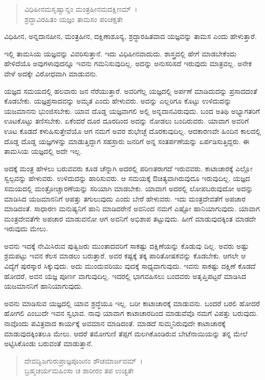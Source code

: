 \begin{verse}
ವಿಧಿಹೀನಮಸೃಷ್ವಾನ್ನಂ ಮಂತ್ರಹೀನಮದಕ್ಷಿಣಮ್~।\\ಶ್ರದ್ಧಾವಿರಹಿತಂ ಯಜ್ಞಂ ತಾಮಸಂ ಪರಿಚಕ್ಷತೇ 
\end{verse}

{\small ವಿಧಿಹೀನ, ಅನ್ನದಾನಹೀನ, ಮಂತ್ರಹೀನ, ದಕ್ಷಿಣಾಶೂನ್ಯ, ಶ್ರದ್ಧಾರಹಿತವಾದ ಯಜ್ಞವನ್ನು ತಾಮಸ ಎಂದು ಹೇಳುತ್ತಾರೆ.}

ಇಲ್ಲಿ ತಾಮಸಿಯ ಯಜ್ಞವನ್ನು ವಿವರಿಸುತ್ತಾನೆ. ಇದು ವಿಧಿಹೀನವಾದುದು. ಶಾಸ್ತ್ರದಲ್ಲಿ ಹೇಗೆ ಮಾಡಬೇಕೆಂದು ಹೇಳಿದೆಯೊ ಅವುಗಳಾವುದನ್ನೂ ಇವನು ಗಮನಿಸುವುದಿಲ್ಲ. ಅದನ್ನು ಅನುಸರಿಸದೆ ಇರುವುದು ಮಾತ್ರವಲ್ಲ. ಅನೇಕ ವೇಳೆ ಅದಕ್ಕೇ ವಿರೋಧವಾಗಿ ಮಾಡುವನು.

ಯಜ್ಞದ ಸಮಯದಲ್ಲಿ ಹಲವಾರು ಜನ ನೆರೆಯುತ್ತಾರೆ. ಅವರಿಗೆಲ್ಲ ಯಜ್ಞದಲ್ಲಿ ಅರ್ಪಣೆ ಮಾಡಿದುದನ್ನು ಪ್ರಸಾದದಂತೆ ಕೊಡಬೇಕು. ಯಜ್ಞಪ್ರಸಾದವನ್ನು ಅಮೃತ ಎಂದು ಹೇಳುವರು. ಅದನ್ನು ಎಲ್ಲರಿಗೂ ಕೊಟ್ಟು ಉಳಿದುದನ್ನು ಯಜಮಾನನು ಭುಂಜಿಸಬೇಕು. ಯಾವ ದೊಡ್ಡ ಯಜ್ಞವಾಗಲಿ ಅಲ್ಲಿ ಅನ್ನದಾನವಿರುವುದು. ಬಂದ ಅತಿಥಿ ಅಭ್ಯಾಗತರಿಗೆ ಊಟಕೊಟ್ಟು ತಣಿಸಬೇಕು. ಏಕೆಂದರೆ ದೂರ ದೂರದಿಂದ ಅದನ್ನು ನೋಡಲು ಬಂದಿರುವರು. ಯಾವಾಗ ಅವರಿಗೆ ಊಟ ಕೊಡದೆ ಕಳುಹಿಸುತ್ತೇವೆಯೊ ಆಗ ನಮಗೆ ಅವರ ಶುಭೇಚ್ಛೆ ದೊರಕುವುದಿಲ್ಲ. ಆದಕಾರಣವೇ ಹಿಂದಿನ ಕಾಲದಲ್ಲಿ ದೊಡ್ಡ ದೊಡ್ಡ ಯಜ್ಞಗಳನ್ನು ಮಾಡುತ್ತಿದ್ದಾಗ ಸಹಸ್ರಾರು ಜನರಿಗೆ ಅನ್ನ ಸಂತರ್ಪಣೆಯನ್ನು ಏರ್ಪಡಿಸುತ್ತಿದ್ದರು. ಈ ತಾಮಸಿಯ ಯಜ್ಞದಲ್ಲಿ ಅದೇ ಇಲ್ಲ.

ಅದಕ್ಕೆ ಮಂತ್ರ ಹೇಳಲು ಬರುವವರು ಕೂಡ ಚೆನ್ನಾಗಿ ಅದರಲ್ಲಿ ಪರಿಣತರಾಗದೆ ಇರುವವರು. ಕಾಟಾಚಾರಕ್ಕೆ ಎಲ್ಲೋ ಸ್ವಲ್ಪವನ್ನು ಹೇಳುವರು. ಉಳಿದುದನ್ನು ಹಾರಿಸುವರು. ಆ ಸಮಯಕ್ಕೆ ಔಚಿತ್ಯವಾಗಿರುವುದೂ ಇರುವುದಿಲ್ಲ. ಯಜ್ಞದ ಸಮಯದಲ್ಲಿ ಮಂತ್ರೋಚ್ಚಾರಣೆಯನ್ನು ಸರಿಯಾಗಿ ಮಾಡಬೇಕು. ಯಾವಾಗ ಅದರಲ್ಲಿ ಲೋಪಬರುವುದೋ ಅದನ್ನು ಮಾಡಿಸಿದ ಯಜಮಾನನಿಗೆ ಆಪತ್ತು ತಗುಲುವುದು ಎಂದು ಬೇರೆ ಹೇಳುವರು. ಇದು ಮಂತ್ರದೇವತೆಗೆ ಅಪಚಾರ ಮಾಡಿದಂತೆ. ಸಾಧಾರಣ ಮನುಷ್ಯನಿಗೆ ಹಾನಿ ಮಾಡಿದರೇನೆ ಅವನಿಂದ ನಮಗೆ ಎಷ್ಟೋ ಹಾನಿಯಾಗುವುದು. ಯಾವಾಗ ಮಂತ್ರದೇವತೆಗೇ ಅಪಚಾರ ಮಾಡುವನೋ ಆಗ ಅವನಿಗೆ ಅಭಿಶಾಪ ತಟ್ಟುವುದು. ಹೀಗೆ ಮಾಡುವುದಕ್ಕಿಂತ ಮಾಡದೇ ಇರುವುದು ಮೇಲು. 

ಅವನು ಇದಕ್ಕೆ ನೇಮಿಸಿರುವ ಪುತ್ವಿಜರು ಮುಂತಾದವರಿಗೆ ಸಾಕಷ್ಟು ದಕ್ಷಿಣೆಯನ್ನು ಕೊಡುವು ದಿಲ್ಲ. ಅವರು ಅಷ್ಟು ಶ್ರಮಪಟ್ಟು ಇವನ ಕೆಲಸ ಮಾಡಲು ಬರುತ್ತಾರೆ. ಅವರ ಕಷ್ಟಕ್ಕೆ ತಕ್ಕ ಪಾರಿತೋಷಕವನ್ನು ಕೊಡಬೇಕು. ಆಗಲೇ ಆ ವಿದ್ಯೆಗೆ ಪುರಸ್ಕಾರ ಸಿಕ್ಕುವುದು. ಅದು ಮುಂದುವರಿಯು ವುದಕ್ಕೆ ಸಾಧ್ಯವಾಗುವುದು. ಇವನು ಸಾಕಷ್ಟು ದಕ್ಷಿಣೆ ಕೊಡದೆ ಹೋದರೆ, ಅವನ ಯಜ್ಞ ಪೂರ್ಣ ವಾಗುವುದಿಲ್ಲ. ಇದರಲ್ಲಿ ಭಾಗವಹಿಸಲು ಬಂದವರು ಅತೃಪ್ತಿಪಟ್ಟರೆ ಮಾಡಿಸಿದ ಯಜಮಾನನಿಗೆ ಹಾನಿಯಾಗುವುದು.

ಅವನು ಮಾಡಿಸುವ ಯಜ್ಞದಲ್ಲಿ ಯಾವ ಶ್ರದ್ಧೆಯೂ ಇಲ್ಲ. ಬರೀ ಕಾಟಾಚಾರಕ್ಕೆ ಮಾಡುವನು. ಬಂದರೆ ಬರಲಿ ಹೋದರೆ ಹೋಗಲಿ ಎಂಬುದೇ ಇವನ ಸ್ವಭಾವ. ನಾವು ಯಾವಾಗ ಕಾಟಾಚಾರದಿಂದ ಮಾಡುವೆವೊ ನಮಗೆ ವಿಪತ್ತು ಬರುವುದು. ನಾವೊಂದು ಪವಿತ್ರವಾದ ಕಾರ್ಯಕ್ಕೆ ಅವಮಾನ ಮಾಡಿದಂತೆ. ಮಾಡದೆ ಸುಮ್ಮನಿರುವುದೇ ಕಾಟಾಚಾರಕ್ಕೆ ಮಾಡುವುದಕ್ಕಿಂತಲೂ ಮೇಲು. ಆದರೆ ತಮೋಗುಣಿ ತೆಪ್ಪಗೆ ಮಲಗಿಕೊಂಡಿರುವ ಬೇಟೆನಾಯಿಯನ್ನು ತನ್ನ ಮೇಲೆ ಅಟ್ಟಿಸಿಕೊಂಡು ಬರುವಂತೆ ಮಾಡುತ್ತಾನೆ.

\begin{verse}
ದೇವದ್ವಿಜಗುರುಪ್ರಾಜ್ಞಪೂಜನಂ ಶೌಚಮಾರ್ಜವಮ್~।\\ಬ್ರಹ್ಮಚರ್ಯಮಹಿಂಸಾ ಚ ಶಾರೀರಂ ತಪ ಉಚ್ಯತೇ 
\end{verse}

